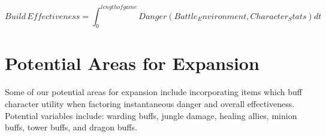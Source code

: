 \documentclass{article}
\begin{document}
\begin{equation}
	\label{simple_equation}
	Build \hspace{2pt} Effectiveness = \int_0^{length of game}Danger(Battle_Environment, Character_Stats)dt
\end{equation}

\newpage
\section{Potential Areas for Expansion}
Some of our potential areas for expansion include incorporating items which buff character utility when factoring instantaneous danger and overall effectiveness.  Potential variables include: warding buffs, jungle damage, healing allies, minion buffs, tower buffs, and dragon buffs.
\end{document}
